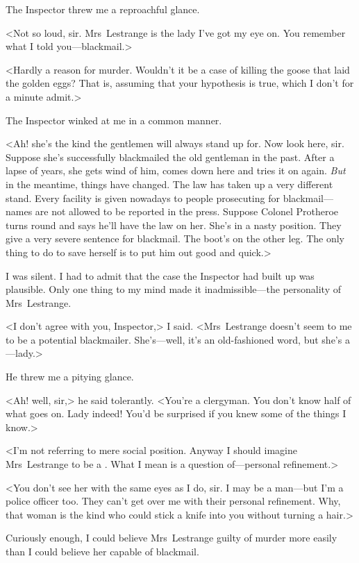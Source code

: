 The Inspector threw me a reproachful glance.

<Not so loud, sir. Mrs~Lestrange is the lady I've got my eye on. You remember what I told you—blackmail.>

<Hardly a reason for murder. Wouldn't it be a case of killing the goose that laid the golden eggs? That is, assuming that your hypothesis is true, which I don't for a minute admit.>

The Inspector winked at me in a common manner.

<Ah! she's the kind the gentlemen will always stand up for. Now look here, sir. Suppose she's successfully blackmailed the old gentleman in the past. After a lapse of years, she gets wind of him, comes down here and tries it on again. \emph{But} in the meantime, things have changed. The law has taken up a very different stand. Every facility is given nowadays to people prosecuting for blackmail—names are not allowed to be reported in the press. Suppose Colonel Protheroe turns round and says he'll have the law on her. She's in a nasty position. They give a very severe sentence for blackmail. The boot's on the other leg. The only thing to do to save herself is to put him out good and quick.>

I was silent. I had to admit that the case the Inspector had built up was plausible. Only one thing to my mind made it inadmissible—the personality of Mrs~Lestrange.

<I don't agree with you, Inspector,> I said. <Mrs~Lestrange doesn't seem to me to be a potential blackmailer. She's—well, it's an old-fashioned word, but she's a—lady.>

He threw me a pitying glance.

<Ah! well, sir,> he said tolerantly. <You're a clergyman. You don't know half of what goes on. Lady indeed! You'd be surprised if you knew some of the things I know.>

<I'm not referring to mere social position. Anyway I should imagine Mrs~Lestrange to be a . What I mean is a question of—personal refinement.>

<You don't see her with the same eyes as I do, sir. I may be a man—but I'm a police officer too. They can't get over me with their personal refinement. Why, that woman is the kind who could stick a knife into you without turning a hair.>

Curiously enough, I could believe Mrs~Lestrange guilty of murder more easily than I could believe her capable of blackmail.

